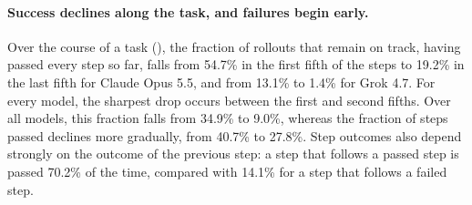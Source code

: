 \documentclass{article}
\begin{document}
\paragraph{Success declines along the task, and failures begin early.}
Over the course of a task (), the fraction of rollouts that
remain on track, having passed every step so far, falls from 54.7\% in the
first fifth of the steps to 19.2\% in the last fifth for Claude Opus 5.5, and
from 13.1\% to 1.4\% for Grok 4.7. For every model, the sharpest drop occurs
between the first and second fifths. Over all models, this fraction falls from
34.9\% to 9.0\%, whereas the fraction of steps passed declines more gradually,
from 40.7\% to 27.8\%. Step outcomes also depend strongly on the
outcome of the previous step: a step that follows a passed step is passed
70.2\% of the time, compared with 14.1\% for a step that follows a failed step.
\end{document}
